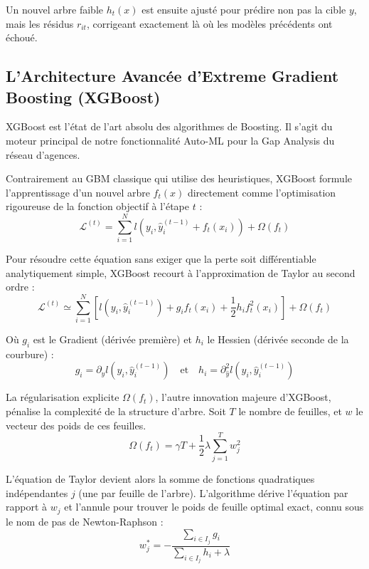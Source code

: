 \documentclass[11pt,a4paper,twoside]{report}
\begin{document}
Un nouvel arbre faible $h_t(x)$ est ensuite ajusté pour prédire non pas la cible $y$, mais les résidus $r_{it}$, corrigeant exactement là où les modèles précédents ont échoué.

\subsection{L'Architecture Avancée d'Extreme Gradient Boosting (XGBoost)}

XGBoost \cite{chen2016} est l'état de l'art absolu des algorithmes de Boosting. Il s'agit du moteur principal de notre fonctionnalité Auto-ML pour la Gap Analysis du réseau d'agences.

Contrairement au GBM classique qui utilise des heuristiques, XGBoost formule l'apprentissage d'un nouvel arbre $f_t(x)$ directement comme l'optimisation rigoureuse de la fonction objectif à l'étape $t$ :
\begin{equation}
\mathcal{L}^{(t)} = \sum_{i=1}^{N} l(y_i, \hat{y}_i^{(t-1)} + f_t(x_i)) + \Omega(f_t)
\end{equation}

Pour résoudre cette équation sans exiger que la perte soit différentiable analytiquement simple, XGBoost recourt à l'approximation de Taylor au second ordre :
\begin{equation}
\mathcal{L}^{(t)} \simeq \sum_{i=1}^{N} \left[ l(y_i, \hat{y}_i^{(t-1)}) + g_i f_t(x_i) + \frac{1}{2} h_i f_t^2(x_i) \right] + \Omega(f_t)
\end{equation}

Où $g_i$ est le Gradient (dérivée première) et $h_i$ le Hessien (dérivée seconde de la courbure) :
\begin{equation}
g_i = \partial_{\hat{y}} l(y_i, \hat{y}_i^{(t-1)}) \quad \text{et} \quad h_i = \partial_{\hat{y}}^2 l(y_i, \hat{y}_i^{(t-1)})
\end{equation}

La régularisation explicite $\Omega(f_t)$, l'autre innovation majeure d'XGBoost, pénalise la complexité de la structure d'arbre. Soit $T$ le nombre de feuilles, et $w$ le vecteur des poids de ces feuilles.
\begin{equation}
\Omega(f_t) = \gamma T + \frac{1}{2} \lambda \sum_{j=1}^{T} w_j^2
\end{equation}

L'équation de Taylor devient alors la somme de fonctions quadratiques indépendantes $j$ (une par feuille de l'arbre). L'algorithme dérive l'équation par rapport à $w_j$ et l'annule pour trouver le poids de feuille optimal exact, connu sous le nom de pas de Newton-Raphson :
\begin{equation}
w_j^* = - \frac{\sum_{i \in I_j} g_i}{\sum_{i \in I_j} h_i + \lambda}
\end{equation}
\end{document}
